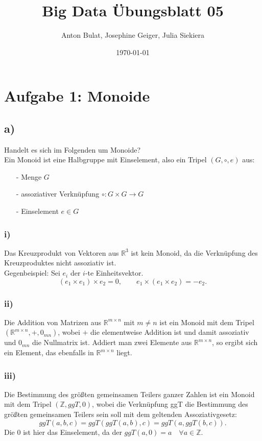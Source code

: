 \documentclass{article}
\title{Big Data \"Ubungsblatt 05}
\author{Anton Bulat, Josephine Geiger, Julia Siekiera} %
\date{\today} %
\begin{document}
\maketitle %

\section*{Aufgabe 1: Monoide}

\subsection*{a)}
Handelt es sich im Folgenden um Monoide?\\
Ein Monoid ist eine Halbgruppe mit Einselement, also ein Tripel $(G, \circ, e)$ aus:
\begin{enumerate}
\item[-] Menge $G$
\item[-] assoziativer Verkn\"upfung $\circ: G \times G \rightarrow G$
\item[-] Einselement $e \in G$
\end{enumerate}
\subsubsection*{i)}
Das Kreuzprodukt von Vektoren aus $\mathbb{R}^3$ ist kein Monoid, da die Verkn\"upfung des Kreuzproduktes nicht assoziativ ist.\\
Gegenbeispiel: Sei $e_i$ der $i$-te Einheitsvektor.
$$(e_1 \times e_1) \times e_2 = 0, \qquad e_1 \times(e_1 \times e_2) = -e_2.$$
\subsubsection*{ii)}
Die Addition von Matrizen aus $\mathbb{R}^{m\times n}$ mit $m \neq n$ ist ein Monoid mit dem Tripel $(\mathbb{R}^{m \times n}, +, 0_{mn})$, wobei $+$ die elementweise Addition ist und damit assoziativ und $0_{mn}$ die Nullmatrix ist. Addiert man zwei Elemente aus $\mathbb{R}^{m\times n}$, so ergibt sich ein Element, das ebenfalls in $\mathbb{R}^{m\times n}$ liegt.
\subsubsection*{iii)}
Die Bestimmung des gr\"o\ss ten gemeinsamen Teilers ganzer Zahlen ist ein Monoid mit dem Tripel $(\mathbb{Z}, ggT, 0)$, wobei die Verkn\"upfung ggT die Bestimmung des gr\"o\ss ten gemeinsamen Teilers sein soll mit dem geltenden Assoziativgesetz: $$ggT(a,b,c) = ggT(ggT(a,b),c) = ggT(a,ggT(b,c)).$$
Die $0$ ist hier das Einselement, da der $ggT(a,0)=a\quad \forall a \in \mathbb{Z}$.
\end{document}
